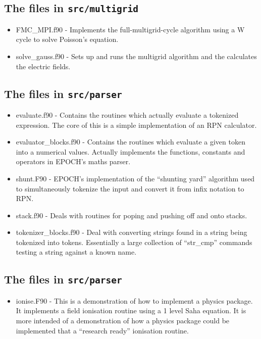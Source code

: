 \documentclass[12pt,a4paper]{article}
\newcommand{\inlinecode}[1]{{\color{warwickred} \bf\texttt{#1}}}
\begin{document}
\subsection{The files in \inlinecode{src/multigrid}}
\begin{itemize}
\item FMC\_MPI.f90 - Implements the full-multigrid-cycle algorithm using a W
  cycle to solve Poisson's equation.
\item solve\_gauss.f90 - Sets up and runs the multigrid algorithm and the
  calculates the electric fields.
\end{itemize}

\subsection{The files in \inlinecode{src/parser}}
\begin{itemize}
\item evaluate.f90 - Contains the routines which actually evaluate a tokenized
  expression. The core of this is a simple implementation of an RPN
  calculator.
\item evaluator\_blocks.f90 - Contains the routines which evaluate a given
  token into a numerical values. Actually implements the functions, constants
  and operators in EPOCH's maths parser.
\item shunt.F90 - EPOCH's implementation of the ``shunting yard'' algorithm used
  to simultaneously tokenize the input and convert it from infix notation to
  RPN.
\item stack.f90 - Deals with routines for poping and pushing off and onto
  stacks.
\item tokenizer\_blocks.f90 - Deal with converting strings found in a string
  being tokenized into tokens. Essentially a large collection of ``str\_cmp''
  commands testing a string against a known name.
\end{itemize}

\subsection{The files in \inlinecode{src/parser}}
\begin{itemize}
\item ionise.F90 - This is a demonstration of how to implement a physics
  package. It implements a field ionisation routine using a 1 level Saha
  equation. It is more intended of a demonstration of how a physics package
  could be implemented that a ``research ready'' ionisation routine.
\end{itemize}
\end{document}
